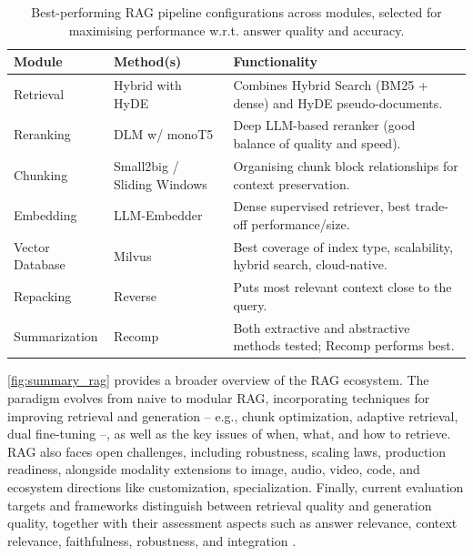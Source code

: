 \begin{spacing}{1.5}
\addtocounter{table}{-1}
\begin{table}[H]
\centering
\begin{tabularx}{\textwidth}{l>{\raggedright\arraybackslash}X>{\raggedright\arraybackslash}X}
\toprule
\textbf{Module}         & \textbf{Method(s)} & \textbf{Functionality} \\
\midrule
Retrieval         & Hybrid with HyDE            & Combines Hybrid Search (BM25 + dense) and HyDE pseudo-documents. \\
\cmidrule(lr){1-3}
Reranking         & DLM w/ monoT5                      & Deep LLM-based reranker (good balance of quality and speed). \\
\cmidrule(lr){1-3}
Chunking          & Small2big / Sliding Windows & Organising chunk block relationships for context preservation. \\
\cmidrule(lr){1-3}
Embedding         & LLM-Embedder                & Dense supervised retriever, best trade-off performance/size. \\
\cmidrule(lr){1-3}
Vector Database   & Milvus                      & Best coverage of index type, scalability, hybrid search, cloud-native. \\
\cmidrule(lr){1-3}
Repacking         & Reverse                     & Puts most relevant context close to the query. \\
\cmidrule(lr){1-3}
Summarization     & Recomp                      & Both extractive and abstractive methods tested; Recomp performs best. \\
\bottomrule
\end{tabularx}
\vspace{0.5em}
\caption{Best-performing RAG pipeline configurations across modules, selected for maximising performance w.r.t. answer quality and accuracy.}
\label{tab:best_rag}
\end{table}

\autoref{fig:summary_rag} provides a broader overview of the RAG ecosystem. The paradigm evolves from naive to modular RAG, incorporating techniques for improving retrieval and generation -- e.g., chunk optimization, adaptive retrieval, dual fine-tuning --, as well as the key issues of when, what, and how to retrieve. RAG also faces open challenges, including robustness, scaling laws, production readiness, alongside modality extensions to image, audio, video, code, and ecosystem directions like customization, specialization. Finally, current evaluation targets and frameworks distinguish between retrieval quality and generation quality, together with their assessment aspects such as answer relevance, context relevance, faithfulness, robustness, and integration \citep{gao_retrieval-augmented_2024}.


\end{spacing}
